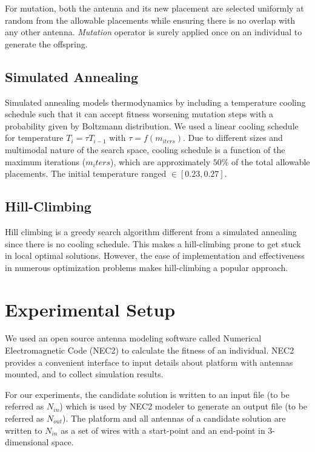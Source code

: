 \documentclass[conference]{IEEEtran}
\begin{document}
For mutation, both the antenna and its new placement are selected uniformly at random from the allowable placements while ensuring there is no overlap with any other antenna. \textit{Mutation} operator is surely applied once on an individual to generate the offspring.
\subsection{Simulated Annealing}
\label{sec:algoriths-sa}
Simulated annealing models thermodynamics by including a temperature cooling schedule such that it can accept fitness worsening mutation steps with a probability given by Boltzmann distribution. We used a linear cooling schedule for temperature $T_i = \tau T_{i-1}$ with $\tau = f(m_{iters})$. Due to different sizes and multimodal nature of the search space, cooling schedule is a function of the maximum iterations ($m_iters$), which are approximately $50\%$ of the total allowable placements. The initial temperature ranged $\in [0.23, 0.27]$.
\subsection{Hill-Climbing}
\label{sec:algoriths-hc}
Hill climbing is a greedy search algorithm different from a simulated annealing since there is no cooling schedule. This makes a hill-climbing prone to get stuck in local optimal solutions. However, the ease of implementation and effectiveness in numerous optimization problems \cite{skalak1994} makes hill-climbing a popular approach.

\section{Experimental Setup}
\label{sec:setup}
We used an open source antenna modeling software called Numerical Electromagnetic Code (NEC2) to calculate the fitness of an individual. NEC2 provides a convenient interface to input details about platform with antennas mounted, and to collect simulation results.

For our experiments, the candidate solution is written to an input file (to be referred as $N_{in}$) which is used by NEC2 modeler to generate an output file (to be referred as $N_{out}$). The platform and all antennas of a candidate solution are written to $N_{in}$ as a set of wires with a start-point and an end-point in 3-dimensional space.  
\end{document}

